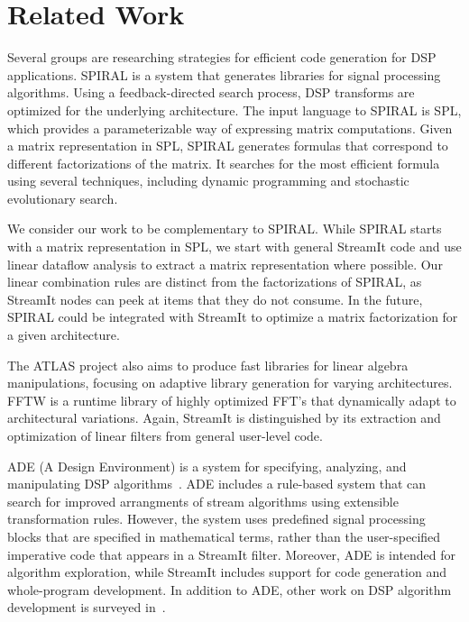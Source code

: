 \section{Related Work}
\label{sec:related}

Several groups are researching strategies for efficient code
generation for DSP applications.  SPIRAL is a system that generates
libraries for signal processing
algorithms\cite{spiral,johnson01searching,egner01automatic}.  Using a
feedback-directed search process, DSP transforms are optimized for the
underlying architecture.  The input language to SPIRAL is
SPL\cite{xiong01spl,xiong-thesis}, which provides a parameterizable
way of expressing matrix computations.  Given a matrix representation
in SPL, SPIRAL generates formulas that correspond to different
factorizations of the matrix.  It searches for the most efficient
formula using several techniques, including dynamic programming and
stochastic evolutionary search.

We consider our work to be complementary to SPIRAL.  While SPIRAL
starts with a matrix representation in SPL, we start with general
StreamIt code and use linear dataflow analysis to extract a matrix
representation where possible.  Our linear combination rules are
distinct from the factorizations of SPIRAL, as StreamIt nodes can peek
at items that they do not consume.  In the future, SPIRAL could be
integrated with StreamIt to optimize a matrix factorization for a
given architecture.

The ATLAS project \cite{whaley01automated} also aims to produce fast
libraries for linear algebra manipulations, focusing on adaptive
library generation for varying architectures.  FFTW
\cite{frigo99fast,fftw} is a runtime library of highly optimized FFT's
that dynamically adapt to architectural variations.  Again, StreamIt
is distinguished by its extraction and optimization of linear filters
from general user-level code.

ADE (A Design Environment) is a system for specifying, analyzing, and
manipulating DSP algorithms~\cite{covell-ade}.  ADE includes a
rule-based system that can search for improved arrangments of stream
algorithms using extensible transformation rules.  However, the system
uses predefined signal processing blocks that are specified in
mathematical terms, rather than the user-specified imperative code
that appears in a StreamIt filter.  Moreover, ADE is intended for
algorithm exploration, while StreamIt includes support for code
generation and whole-program development.  In addition to ADE, other
work on DSP algorithm development is surveyed
in~\cite{oppenheim-symbolic}.

